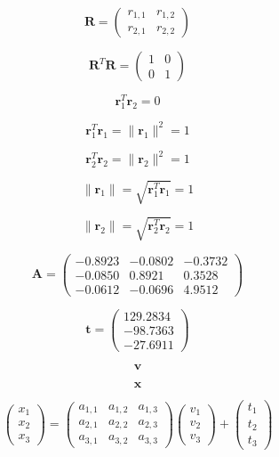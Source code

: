 \documentclass[10pt,twoside]{book}
\newcommand{\fat}[1]{\mathbf{#1}} %
\newcommand{\transp}{^T} %
\begin{document}
$$
\fat{R}
=
\left(
\begin{array}{cc}
r_{1,1} & r_{1,2} \\
r_{2,1} & r_{2,2}
\end{array}
\right)
$$

$$
\fat{R}\transp \fat{R}
=
\left(
\begin{array}{cc}
1 & 0 \\
0 & 1
\end{array}
\right)
$$

$$
\fat{r}_1\transp \fat{r}_2 = 0
$$

$$
\fat{r}_1\transp \fat{r}_1 = \| \fat{r}_1 \|^2 = 1
$$

$$
\fat{r}_2\transp \fat{r}_2 = \| \fat{r}_2 \|^2 = 1
$$

$$
\| \fat{r}_1 \| = \sqrt{ \fat{r}_1\transp \fat{r}_1 } = 1
$$

$$
\| \fat{r}_2 \| = \sqrt{ \fat{r}_2\transp \fat{r}_2 } = 1
$$


% 
% 

$$
\fat{A} 
= 
\left(
\begin{array}{rrr}
-0.8923 &  -0.0802 &  -0.3732 \\
-0.0850 &   0.8921 &   0.3528 \\
-0.0612 &  -0.0696 &   4.9512
\end{array}
\right)
$$

$$
\fat{t}
=
\left(
\begin{array}{r}
129.2834 \\
-98.7363 \\
-27.6911
\end{array}
\right)
$$

$$
\fat{v}
$$

$$
\fat{x}
$$


$$
\left(
\begin{array}{c}
x_1 \\
x_2 \\
x_3
\end{array}
\right)
= 
\left(
\begin{array}{ccc}
a_{1,1} & a_{1,2} & a_{1,3} \\
a_{2,1} & a_{2,2} & a_{2,3} \\
a_{3,1} & a_{3,2} & a_{3,3}
\end{array}
\right)
\left(
\begin{array}{c}
v_1 \\
v_2 \\
v_3
\end{array}
\right)
+
\left(
\begin{array}{c}
t_1 \\
t_2 \\
t_3
\end{array}
\right)
$$
\end{document}
